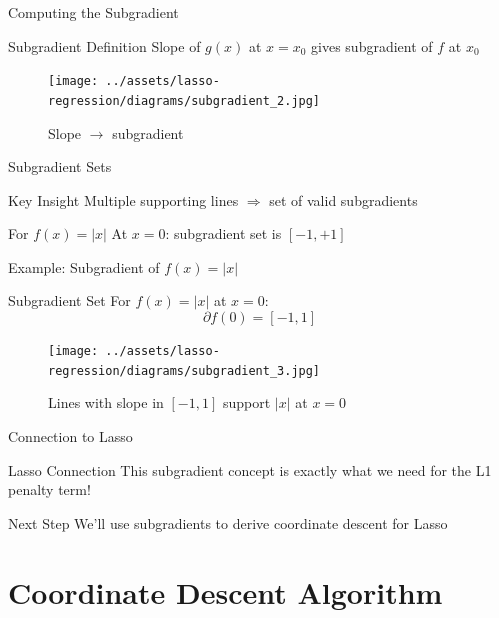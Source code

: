 \documentclass{beamer}
\begin{document}
\begin{frame}{Computing the Subgradient}
\begin{theorembox}{Subgradient Definition}
Slope of $g(x)$ at $x = x_0$ gives subgradient of $f$ at $x_0$
\end{theorembox}

\begin{figure}
\centering
\texttt{[image: ../assets/lasso-regression/diagrams/subgradient\_2.jpg]}
\caption{{\footnotesize Slope $\rightarrow$ subgradient}}
\label{fig:my_label}
\end{figure}
\end{frame}

\begin{frame}{Subgradient Sets}
\begin{keypointsbox}{Key Insight}
Multiple supporting lines $\Rightarrow$ set of valid subgradients
\end{keypointsbox}

\begin{examplebox}{For $f(x) = |x|$}
At $x = 0$: subgradient set is $[-1, +1]$
\end{examplebox}
\end{frame}

\begin{frame}{Example: Subgradient of $f(x) = |x|$}
\begin{codebox}{Subgradient Set}
For $f(x) = |x|$ at $x = 0$:
$$\partial f(0) = [-1, 1]$$
\end{codebox}

\begin{figure}
\centering
\texttt{[image: ../assets/lasso-regression/diagrams/subgradient\_3.jpg]}
\caption{{\footnotesize Lines with slope in $[-1,1]$ support $|x|$ at $x=0$}}
\label{fig:my_label}
\end{figure}
\end{frame}

\begin{frame}{Connection to Lasso}
\begin{alertbox}{Lasso Connection}
This subgradient concept is exactly what we need for the L1 penalty term!
\end{alertbox}

\begin{keypointsbox}{Next Step}
We'll use subgradients to derive coordinate descent for Lasso
\end{keypointsbox}
\end{frame}

\section{Coordinate Descent Algorithm}
\end{document}
